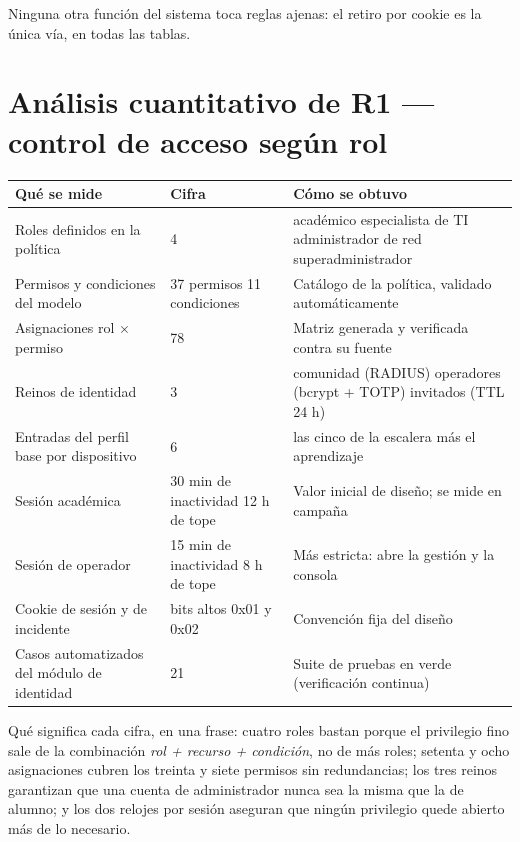 \documentclass[11pt,a4paper]{article}
\begin{document}
Ninguna otra función del sistema toca reglas ajenas: el retiro por cookie es la única vía, en todas las tablas.

\section{Análisis cuantitativo de R1 --- control de acceso según rol}



\begin{longtable}{p{6.4cm}p{2.2cm}p{5.4cm}}
\toprule
\textbf{Qué se mide} & \textbf{Cifra} & \textbf{Cómo se obtuvo}\\
\midrule
Roles definidos en la política & 4 & académico \textperiodcentered{} especialista de TI \textperiodcentered{} administrador de red \textperiodcentered{} superadministrador\\
Permisos y condiciones del modelo & 37 permisos \textperiodcentered{} 11 condiciones & Catálogo de la política, validado automáticamente\\
Asignaciones rol $\times$ permiso & 78 & Matriz generada y verificada contra su fuente\\
Reinos de identidad & 3 & comunidad (RADIUS) \textperiodcentered{} operadores (bcrypt + TOTP) \textperiodcentered{} invitados (TTL 24 h)\\
Entradas del perfil base por dispositivo & 6 & las cinco de la escalera más el aprendizaje\\
Sesión académica & 30 min de inactividad \textperiodcentered{} 12 h de tope & Valor inicial de diseño; se mide en campaña\\
Sesión de operador & 15 min de inactividad \textperiodcentered{} 8 h de tope & Más estricta: abre la gestión y la consola\\
Cookie de sesión y de incidente & bits altos 0x01 y 0x02 & Convención fija del diseño\\
Casos automatizados del módulo de identidad & 21 & Suite de pruebas en verde (verificación continua)\\
\bottomrule
\end{longtable}

Qué significa cada cifra, en una frase: cuatro roles bastan porque el privilegio fino sale de la combinación \emph{rol + recurso + condición}, no de más roles; setenta y ocho asignaciones cubren los treinta y siete permisos sin redundancias; los tres reinos garantizan que una cuenta de administrador nunca sea la misma que la de alumno; y los dos relojes por sesión aseguran que ningún privilegio quede abierto más de lo necesario.
\end{document}

